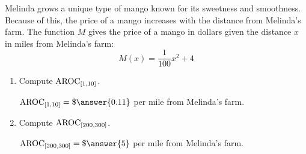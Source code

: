 \documentclass{ximera}
\author{Kenneth Berglund}
\begin{document}
\begin{exercise}

Melinda grows a unique type of mango known for its sweetness and smoothness. Because of this, the price of a mango increases with the distance from Melinda's farm. The function $M$ gives the price of a mango in dollars given the distance $x$ in miles from Melinda's farm:
$$
M(x) = \frac{1}{100}x^2 + 4
$$

\begin{enumerate}
\item Compute $\mathrm{AROC}_{[1, 10]}$.

$\av_{[1, 10]} = \$\answer{0.11}$ per mile from Melinda's farm.  

\item Compute $\mathrm{AROC}_{[200, 300]}$.

$\av_{[200, 300]} = \$\answer{5}$ per mile from Melinda's farm.

	
\end{enumerate}

\end{exercise}
\end{document}
